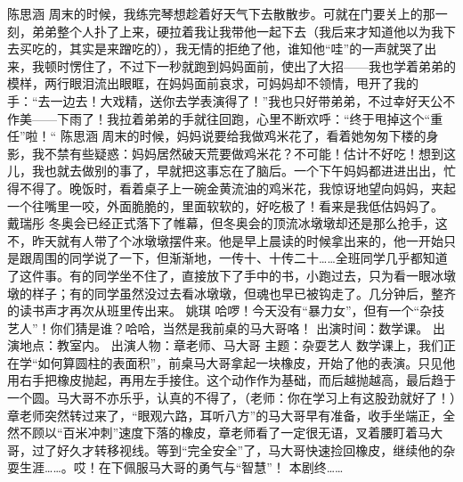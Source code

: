 {}\markdownRendererInterblockSeparator
{}陈思涵\markdownRendererInterblockSeparator
{}周末的时候，我练完琴想趁着好天气下去散散步。可就在门要关上的那一刻，弟弟整个人扑了上来，硬拉着我让我带他一起下去（我后来才知道他以为我下去买吃的，其实是来蹭吃的），我无情的拒绝了他，谁知他“哇”的一声就哭了出来，我顿时愣住了，不过下一秒就跑到妈妈面前，使出了大招——我也学着弟弟的模样，两行眼泪流出眼眶，在妈妈面前哀求，可妈妈却不领情，甩开了我的手：“去一边去！大戏精，送你去学表演得了！”我也只好带弟弟，不过幸好天公不作美——下雨了！我拉着弟弟的手就往回跑，心里不断欢呼：“终于甩掉这个“重任”啦！“\markdownRendererInterblockSeparator
{}\markdownRendererInterblockSeparator
{}陈思涵\markdownRendererInterblockSeparator
{}周末的时候，妈妈说要给我做鸡米花了，看着她匆匆下楼的身影，我不禁有些疑惑：妈妈居然破天荒要做鸡米花？不可能！估计不好吃！想到这儿，我也就去做别的事了，早就把这事忘在了脑后。一个下午妈妈都进进出出，忙得不得了。晚饭时，看着桌子上一碗金黄流油的鸡米花，我惊讶地望向妈妈，夹起一个往嘴里一咬，外面脆脆的，里面软软的，好吃极了！看来是我低估妈妈了。\markdownRendererInterblockSeparator
{}\markdownRendererInterblockSeparator
{}戴瑞彤\markdownRendererInterblockSeparator
{}冬奥会已经正式落下了帷幕，但冬奥会的顶流冰墩墩却还是那么抢手，这不，昨天就有人带了个冰墩墩摆件来。他是早上晨读的时候拿出来的，他一开始只是跟周围的同学说了一下，但渐渐地，一传十、十传二十……全班同学几乎都知道了这件事。有的同学坐不住了，直接放下了手中的书，小跑过去，只为看一眼冰墩墩的样子；有的同学虽然没过去看冰墩墩，但魂也早已被钩走了。几分钟后，整齐的读书声才再次从班里传出来。\markdownRendererInterblockSeparator
{}\markdownRendererInterblockSeparator
{}姚琪\markdownRendererInterblockSeparator
{}哈啰！今天没有“暴力女”，但有一个“杂技艺人”！你们猜是谁？哈哈，当然是我前桌的马大哥咯！\markdownRendererInterblockSeparator
{}出演时间：数学课。 出演地点：教室内。\markdownRendererInterblockSeparator
{}出演人物：章老师、马大哥\markdownRendererInterblockSeparator
{}主题：杂耍艺人\markdownRendererInterblockSeparator
{}数学课上，我们正在学“如何算圆柱的表面积”，前桌马大哥拿起一块橡皮，开始了他的表演。只见他用右手把橡皮抛起，再用左手接住。这个动作作为基础，而后越抛越高，最后趋于一个圆。马大哥不亦乐乎，认真的不得了，（老师：你在学习上有这股劲就好了！）章老师突然转过来了，“眼观六路，耳听八方”的马大哥早有准备，收手坐端正，全然不顾以“百米冲刺”速度下落的橡皮，章老师看了一定很无语，叉着腰盯着马大哥，过了好久才转移视线。等到“完全安全”了，马大哥快速捡回橡皮，继续他的杂耍生涯……。哎！在下佩服马大哥的勇气与“智慧”！ 本剧终……\markdownRendererInterblockSeparator

